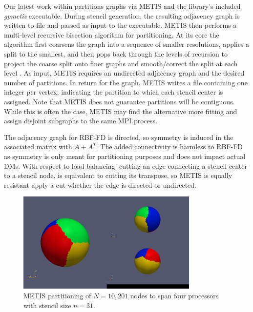 \documentclass{report}
\begin{document}
Our latest work within \cite{BolligRBFFDCode} partitions graphs via METIS and the library's included \emph{gpmetis} executable. During stencil generation, the resulting adjacency graph is written to file and passed as input to the executable. METIS then performs a multi-level recursive bisection algorithm for partitioning. At its core the algorithm first coarsens the graph into a sequence of smaller resolutions, applies a split to the smallest, and then pops back through the levels of recursion to project the coarse split onto finer graphs and smooth/correct the split at each level \cite{Karypis1999}. As input, METIS requires an undirected adjacency graph and the desired number of partitions. 
In return for the graph, METIS writes a file containing one integer per vertex, indicating the partition to which each stencil center is assigned. Note that METIS does not guarantee partitions will be contiguous. While this is often the case, METIS may find the alternative more fitting and assign disjoint subgraphs to the same MPI process. %

The adjacency graph for RBF-FD is directed, so symmetry is induced in the associated matrix with $A+A^T$. The added connectivity is harmless to RBF-FD as symmetry is only meant for partitioning purposes and does not impact actual DMs. With respect to load balancing: cutting an edge connecting a stencil center to a stencil node, is equivalent to cutting its transpose, so METIS is equally resistant apply a cut whether the edge is directed or undirected. 

\begin{figure}
\begin{center}
\includegraphics[width=0.8\textwidth]{rbffd_methods_content/decompositions/gpmetis_decomp_sphere_4parts.png}
\caption{METIS partitioning of $N=10,201$ nodes to span four processors with stencil size $n=31$. }
\label{fig:metis_decomposed_sphere}
\end{center}
\end{figure}
\end{document}
